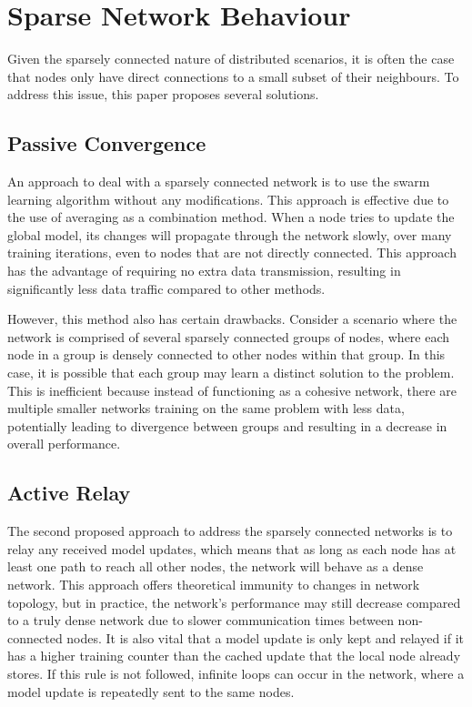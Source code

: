 \section{Sparse Network Behaviour}
Given the sparsely connected nature of distributed scenarios, it is often the case that nodes only have direct connections to a small subset of their neighbours. To address this issue, this paper proposes several solutions.

\subsection{Passive Convergence}
An approach to deal with a sparsely connected network is to use the swarm learning algorithm without any modifications. This approach is effective due to the use of averaging as a combination method. When a node tries to update the global model, its changes will propagate through the network slowly, over many training iterations, even to nodes that are not directly connected. This approach has the advantage of requiring no extra data transmission, resulting in significantly less data traffic compared to other methods.

However, this method also has certain drawbacks. Consider a scenario where the network is comprised of several sparsely connected groups of nodes, where each node in a group is densely connected to other nodes within that group. In this case, it is possible that each group may learn a distinct solution to the problem. This is inefficient because instead of functioning as a cohesive network, there are multiple smaller networks training on the same problem with less data, potentially leading to divergence between groups and resulting in a decrease in overall performance.


\subsection{Active Relay}
The second proposed approach to address the sparsely connected networks is to relay any received model updates, which means that as long as each node has at least one path to reach all other nodes, the network will behave as a dense network. This approach offers theoretical immunity to changes in network topology, but in practice, the network's performance may still decrease compared to a truly dense network due to slower communication times between non-connected nodes. It is also vital that a model update is only kept and relayed if it has a higher training counter than the cached update that the local node already stores. If this rule is not followed, infinite loops can occur in the network, where a model update is repeatedly sent to the same nodes.

